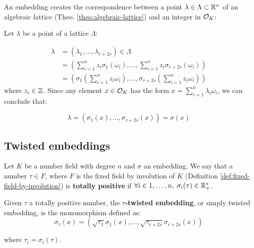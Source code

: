 \documentclass[Ingles]{ic-tese-v3}
\begin{document}
\begin{remark}\label{rem:lat-int-correspondence}
  An embedding creates the correspondence between a point $\lambda \in \Lambda \subset \mathbb{R}^n$ of an algebraic lattice (Theo.
  \ref{theo:algebraic-lattice}) and an integer in $\mathcal{O}_K$:

  Let $\lambda$ be a point of a lattice $\Lambda$:

\begin{align*} 
     \lambda &= (\lambda_1,\dots,\lambda_{r+2s}) \in \Lambda \\
       &= \left( \sum_{i=1}^n{z_i\sigma_1(\omega_i)} , \dots , \sum_{i=1}^n{z_i\sigma_{r+2s}(\omega_i)} \right) \\
       &= \left( \sigma_1\left(   \sum_{i=1}^n{z_i\omega_i} \right) , \dots , \sigma_{r+2s} \left( \sum_{i=1}^n{z_i\omega_i}  \right) \right) 
\end{align*}
  where $z_i \in \mathbb{Z}$. Since any element $x \in \mathcal{O}_K$ has the form $x =
  \sum_{i=1}^n{\lambda_i\omega_i}$, we can conclude that:

  \begin{equation*}
    \lambda = \left( \sigma_1(x), \dots, \sigma_{r+2s}(x) \right) = \sigma(x)
  \end{equation*}

\end{remark}

\subsection{Twisted embeddings}
\label{sec:org552b454}

\begin{definition}
Let $K$ be a number field with degree $n$ and $\sigma$ an embedding. We say that a
number $\tau \in F$, where $F$ is the fixed field by involution of $K$ (Definition
\ref{def:fixed-field-by-involution}) is \textbf{totally  positive} if $\forall i \in {1, \dots , n}, \; \sigma_i(\tau) \in \mathbb{R}^*_+$. 
\end{definition}


\begin{definition}
  \label{def:twisted-emb}
  Given $\tau$ a totally positive number, the \textbf{$\tau$-twisted embedding}, or
  simply twisted embedding, is the monomorphism defined as:
  \begin{equation*}
    \sigma_\tau(x) = \left( \sqrt{\tau_1}\sigma_1(x), \dots, \sqrt{\tau_{r+2s}}\sigma_{r+2s}(x) \right)
  \end{equation*}

  where $\tau_i = \sigma_i(\tau)$.
\end{definition}
\end{document}
